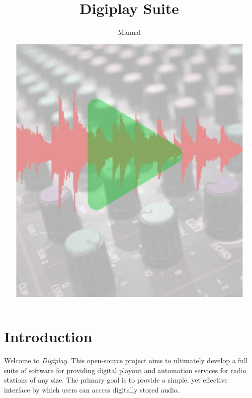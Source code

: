 \documentclass[a4paper,12pt]{report}
\numberwithin{equation}{section}
\begin{document}
\title{Digiplay Suite}
\author{Manual}
\date{\includegraphics{digiplay.pdf}}
\maketitle

\clearpage

\chapter{Introduction}
Welcome to \emph{Digiplay}. This open-source project aims to ultimately develop a full suite of software for providing digital playout and automation services for radio stations of any size. The primary goal is to provide a simple, yet effective interface by which users can access digitally stored audio.
\end{document}
